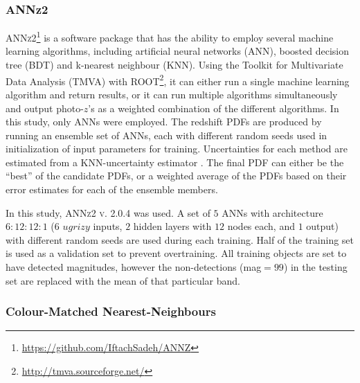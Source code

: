 \subsubsection{ANNz2}
\label{sec:annz2}

\textsc{ANNz2}\footnote{\url{https://github.com/IftachSadeh/ANNZ}} \citep{Sadeh:16} is a software package that has the ability to employ several machine learning algorithms, including artificial neural networks (ANN), boosted decision tree (BDT) and k-nearest neighbour (KNN).
Using the Toolkit for Multivariate Data Analysis (TMVA) with ROOT\footnote{\url{http://tmva.sourceforge.net/}}, it can either run a single machine learning algorithm and return results, or it can run multiple algorithms simultaneously and output photo-$z$'s as a weighted combination of the different algorithms.
In this study, only ANNs were employed.
The redshift PDFs are produced by running an ensemble set of ANNs, each with different random seeds used in initialization of input parameters for training.
Uncertainties for each method are estimated from a KNN-uncertainty estimator \citep{Oyaizu:08}.
The final PDF can either be the ``best'' of the candidate PDFs, or a weighted average of the PDFs based on their error estimates for each of the ensemble members.

In this study, \textsc{ANNz2 v. 2.0.4} was used.
A set of $5$ ANNs with architecture $6:12:12:1$ ($6$ $ugrizy$ inputs, $2$ hidden layers with $12$ nodes each, and $1$ output) with different random seeds are used during each training. %
Half of the training set is used as a validation set to prevent overtraining.
All training objects are set to have detected magnitudes, however the non-detections (mag$=99$) in the testing set are replaced with the mean of that particular band.

\subsubsection{Colour-Matched Nearest-Neighbours}
\label{sec:cmnn}

